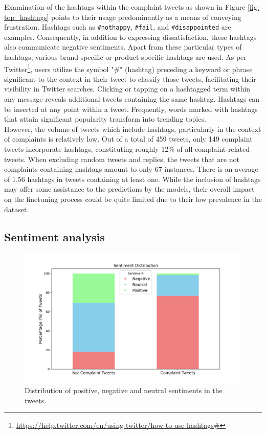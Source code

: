 Examination of the hashtags within the complaint tweets as shown in Figure \ref{fig: top_hashtags} points to their usage predominantly as a means of conveying frustration. Hashtags such as \texttt{\#nothappy}, \texttt{\#fail}, and \texttt{\#disappointed} are examples. Consequently, in addition to expressing dissatisfaction, these hashtags also communicate negative sentiments. Apart from these particular types of hashtags, various brand-specific or product-specific hashtags are used. As per Twitter\footnote{\url{https://help.twitter.com/en/using-twitter/how-to-use-hashtags#}}, users utilize the symbol "\#" (hashtag) preceding a keyword or phrase significant to the context in their tweet to classify those tweets, facilitating their visibility in Twitter searches. Clicking or tapping on a hashtagged term within any message reveals additional tweets containing the same hashtag. Hashtags can be inserted at any point within a tweet. Frequently, words marked with hashtags that attain significant popularity transform into trending topics. \\

However, the volume of tweets which include hashtags, particularly in the context of complaints is relatively low. Out of a total of 459 tweets, only 149 complaint tweets incorporate hashtags, constituting roughly 12\% of all complaint-related tweets. When excluding random tweets and replies, the tweets that are not complaints containing hashtags amount to only 67 instances. There is an average of 1.56 hashtags in tweets containing at least one. While the inclusion of hashtags may offer some assistance to the predictions by the models, their overall impact on the finetuning process could be quite limited due to their low prevalence in the dataset.\\

\subsection{Sentiment analysis}
\begin{figure}[htb]
    \centering
    \captionsetup{font=small}
    \includegraphics[width=12cm]{figures/sentiment.png}
    \vspace*{-3mm}
    \caption{Distribution of positive, negative and neutral sentiments in the tweets.}
    \label{fig: sentiment}
\end{figure}

